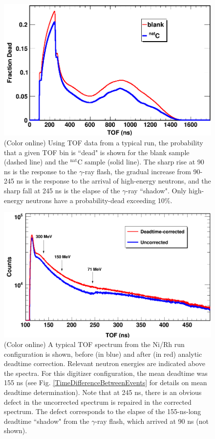 \documentclass[twocolumn,secnumarabic,amssymb, nobibnotes, aps, prl,
superscriptaddress, nobalancelastpage]{revtex4}
\begin{document}
\begin{figure}
    \includegraphics[scale=0.3]{figures/exampleDeadtimeSpectrum.png}
    \caption{(Color online) Using TOF data from a typical run, the probability that a given 
        TOF bin is ``dead" is shown for the blank sample (dashed line) and the $^{\text{nat}}$C   
        sample (solid line). The sharp rise at 90 ns is the response to the
        $\gamma$-ray flash, the gradual increase from 90-245 ns is the response to
        the arrival of high-energy neutrons, and the sharp fall at 245 ns
        is the elapse of the $\gamma$-ray ``shadow". Only high-energy neutrons
        have a probability-dead exceeding 10\%.
    }
    \label{ExampleDeadtimeSpectrum}
\end{figure}

\begin{figure}
    \includegraphics[scale=0.3]{figures/CorrectionEffectOnTOF.png}
    \caption{(Color online) A typical TOF spectrum from the Ni/Rh
        run configuration is shown, before (in blue) and after (in red) analytic
        deadtime correction. Relevant neutron energies are indicated above the spectra.
        For this digitizer configuration, the mean deadtime was 155 ns (see Fig.
        \ref{TimeDifferenceBetweenEvents} for details on mean deadtime determination).
        Note that at 245 ns, there is an
        obvious defect in the uncorrected spectrum is repaired in the corrected
        spectrum. The defect
        corresponds to the elapse of the 155-ns-long deadtime ``shadow" from the $\gamma$-ray
        flash, which arrived at 90 ns (not shown).
    }
    \label{CorrectionEffectOnTOF}
\end{figure}
\end{document}
